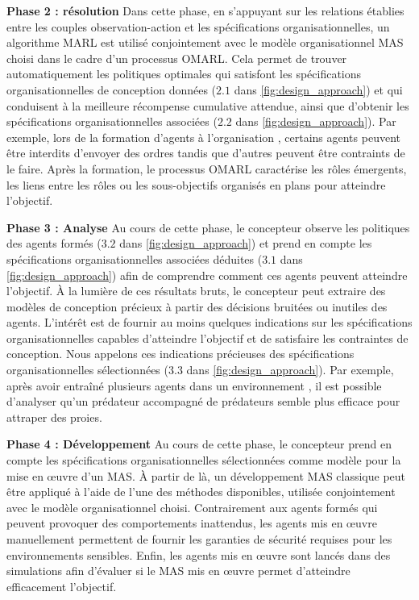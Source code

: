 \textbf{Phase 2 : résolution} \quad Dans cette phase, en s'appuyant sur les relations établies entre les couples observation-action et les spécifications organisationnelles, un algorithme MARL est utilisé conjointement avec le modèle organisationnel MAS choisi dans le cadre d'un processus OMARL. Cela permet de trouver automatiquement les politiques optimales qui satisfont les spécifications organisationnelles de conception données ($2.1$ dans \autoref{fig:design_approach}) et qui conduisent à la meilleure récompense cumulative attendue, ainsi que d'obtenir les spécifications organisationnelles associées ($2.2$ dans \autoref{fig:design_approach}). Par exemple, lors de la formation d'agents à l'organisation , certains agents peuvent être interdits d'envoyer des ordres tandis que d'autres peuvent être contraints de le faire. Après la formation, le processus OMARL caractérise les rôles émergents, les liens entre les rôles ou les sous-objectifs organisés en plans pour atteindre l'objectif.

\textbf{Phase 3 : Analyse} \quad Au cours de cette phase, le concepteur observe les politiques des agents formés ($3.2$ dans \autoref{fig:design_approach}) et prend en compte les spécifications organisationnelles associées déduites ($3.1$ dans \autoref{fig:design_approach}) afin de comprendre comment ces agents peuvent atteindre l'objectif. À la lumière de ces résultats bruts, le concepteur peut extraire des modèles de conception précieux à partir des décisions bruitées ou inutiles des agents. L'intérêt est de fournir au moins quelques indications sur les spécifications organisationnelles capables d'atteindre l'objectif et de satisfaire les contraintes de conception. Nous appelons ces indications précieuses des spécifications organisationnelles sélectionnées ($3.3$ dans \autoref{fig:design_approach}). Par exemple, après avoir entraîné plusieurs agents dans un environnement , il est possible d'analyser qu'un prédateur  accompagné de prédateurs  semble plus efficace pour attraper des proies.

\textbf{Phase 4 : Développement} \quad Au cours de cette phase, le concepteur prend en compte les spécifications organisationnelles sélectionnées comme modèle pour la mise en œuvre d'un MAS. À partir de là, un développement MAS classique peut être appliqué à l'aide de l'une des méthodes disponibles, utilisée conjointement avec le modèle organisationnel choisi. Contrairement aux agents formés qui peuvent provoquer des comportements inattendus, les agents mis en œuvre manuellement permettent de fournir les garanties de sécurité requises pour les environnements sensibles. Enfin, les agents mis en œuvre sont lancés dans des simulations afin d'évaluer si le MAS mis en œuvre permet d'atteindre efficacement l'objectif.

